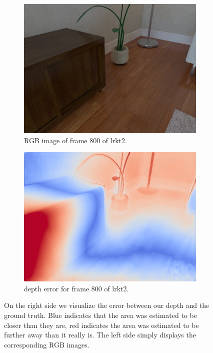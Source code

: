\begin{figure}[ht]
            \begin{subfigure}[b]{.48\textwidth}
                \includegraphics[width=\textwidth]{images/frame_000800.png}
                \caption{RGB image of frame 800 of lrkt2.}
                \label{sfig:frame2}
            \end{subfigure}
            \begin{subfigure}[b]{.48\textwidth}
                \includegraphics[width=\textwidth]{images/error_000800.png}
                \caption{depth error for frame 800 of lrkt2.}
                \label{sfig:error2}
            \end{subfigure}
            \caption{On the right side we visualize the error between our depth and the ground truth. Blue indicates that the area was estimated to be closer than they are, red indicates the area was estimated to be further away than it really is. The left side simply displays the corresponding RGB images.}
            \label{fig:depth_error}
        \end{figure}
        